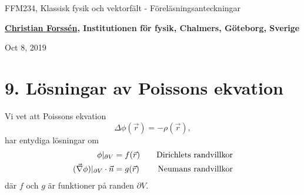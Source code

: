 \documentclass[%
oneside,                 %
final,                   %
10pt]{article}
\begin{document}

\newcommand{\exercisesection}[1]{\subsection*{#1}}







\thispagestyle{empty}

\begin{center}
{\LARGE\bf
\begin{spacing}{1.25}
FFM234, Klassisk fysik och vektorfält - Föreläsningsanteckningar
\end{spacing}
}
\end{center}


\begin{center}
{\bf \href{{http://fy.chalmers.se/subatom/tsp/}}{Christian Forssén}, Institutionen för fysik, Chalmers, Göteborg, Sverige${}^{}$} \\ [0mm]
\end{center}

\begin{center}
\end{center}
    

\begin{center}
Oct 8, 2019
\end{center}

\vspace{1cm}


\section*{9. Lösningar av Poissons ekvation}
Vi vet att Poissons ekvation
$$
\Delta \phi(\vec{r}) = - \rho(\vec{r}),
$$
har entydiga lösningar om
\begin{align}
\phi|_{\partial V} &= f(\vec{r}) \quad & \mathrm{Dirichlets~randvillkor} \nonumber \\
(\vec{\nabla}\phi)|_{\partial V} \cdot \vec{n} &= g(\vec{r}) \quad & \mathrm{Neumans~randvillkor} \nonumber 
\end{align}
där $f$ och $g$ är funktioner på randen $\partial V$.
\end{document}
